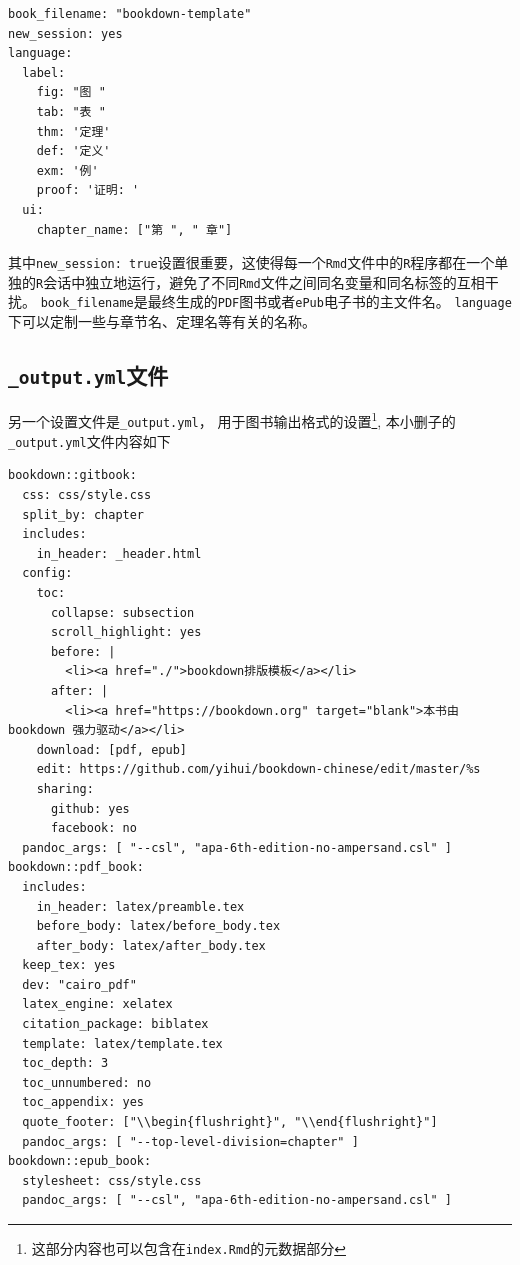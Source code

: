 \documentclass[12pt,]{krantz}
\theoremstyle{plain}
\theoremstyle{nonumberplain}
\begin{document}
\begin{verbatim}
book_filename: "bookdown-template"
new_session: yes
language:
  label:
    fig: "图 "
    tab: "表 "
    thm: '定理'
    def: '定义'
    exm: '例'
    proof: '证明: '
  ui:
    chapter_name: ["第 ", " 章"]
\end{verbatim}

其中\texttt{new\_session:\ true}设置很重要，这使得每一个\texttt{Rmd}文件中的\texttt{R}程序都在一个单独的\texttt{R}会话中独立地运行，避免了不同\texttt{Rmd}文件之间同名变量和同名标签的互相干扰。 \texttt{book\_filename}是最终生成的\texttt{PDF}图书或者\texttt{ePub}电子书的主文件名。 \texttt{language}下可以定制一些与章节名、定理名等有关的名称。

\hypertarget{output.ymlux6587ux4ef6}{%
\subsection{\texorpdfstring{\texttt{\_output.yml}文件}{\_output.yml文件}}\label{output.ymlux6587ux4ef6}}

\indent

另一个设置文件是\texttt{\_output.yml}， 用于图书输出格式的设置\footnote{这部分内容也可以包含在\texttt{index.Rmd}的元数据部分}, 本小删子的\texttt{\_output.yml}文件内容如下

\begin{verbatim}
bookdown::gitbook:
  css: css/style.css
  split_by: chapter
  includes:
    in_header: _header.html
  config:
    toc:
      collapse: subsection
      scroll_highlight: yes
      before: |
        <li><a href="./">bookdown排版模板</a></li>
      after: |
        <li><a href="https://bookdown.org" target="blank">本书由 bookdown 强力驱动</a></li>
    download: [pdf, epub]
    edit: https://github.com/yihui/bookdown-chinese/edit/master/%s
    sharing:
      github: yes
      facebook: no
  pandoc_args: [ "--csl", "apa-6th-edition-no-ampersand.csl" ]
bookdown::pdf_book:
  includes:
    in_header: latex/preamble.tex
    before_body: latex/before_body.tex
    after_body: latex/after_body.tex
  keep_tex: yes
  dev: "cairo_pdf"
  latex_engine: xelatex
  citation_package: biblatex
  template: latex/template.tex
  toc_depth: 3
  toc_unnumbered: no
  toc_appendix: yes
  quote_footer: ["\\begin{flushright}", "\\end{flushright}"]
  pandoc_args: [ "--top-level-division=chapter" ]
bookdown::epub_book:
  stylesheet: css/style.css
  pandoc_args: [ "--csl", "apa-6th-edition-no-ampersand.csl" ]
\end{verbatim}
\end{document}
